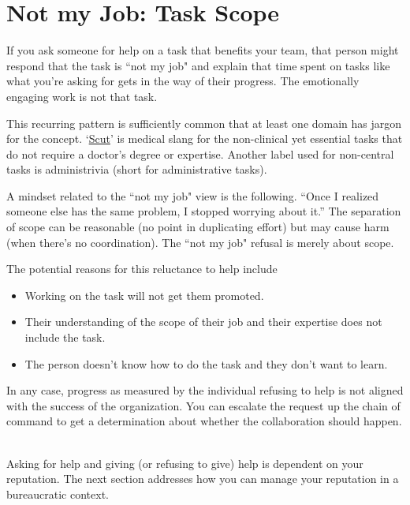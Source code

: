 \section{Not my Job: Task Scope}


If you ask someone for help on a task that benefits your team, that person might respond that the task is ``not my job" and explain that time spent on tasks like what you're asking for gets in the way of their progress. The emotionally engaging work is not that task.

This recurring pattern is sufficiently common that at least one domain has jargon for the concept.
`\href{https://www.urbandictionary.com/define.php?term=scut}{Scut}' 
is medical slang for the non-clinical yet essential tasks that do not require a doctor's degree or expertise.
Another label used for non-central tasks is administrivia (short for administrative tasks).

A mindset related to the ``not my job" view is the following.
``Once I realized someone else has the same problem, I stopped worrying about it.'' The separation of scope can be reasonable (no point in duplicating effort) but may cause harm (when there's no coordination). The ``not my job" refusal is merely about scope. 

The potential reasons for this reluctance to help include
\begin{itemize}
    \item Working on the task will not get them promoted.
    \item Their understanding of the scope of their job and their expertise does not include the task.
    \item The person doesn't know how to do the task and they don't want to learn.
\end{itemize}
In any case, progress as measured by the individual refusing to help is not aligned with the success of the organization. You can escalate the request up the chain of command to get a determination about whether the collaboration should happen.

\ \\


Asking for help and giving (or refusing to give) help is dependent on your reputation.
The next section addresses how you can manage your reputation in a bureaucratic context.